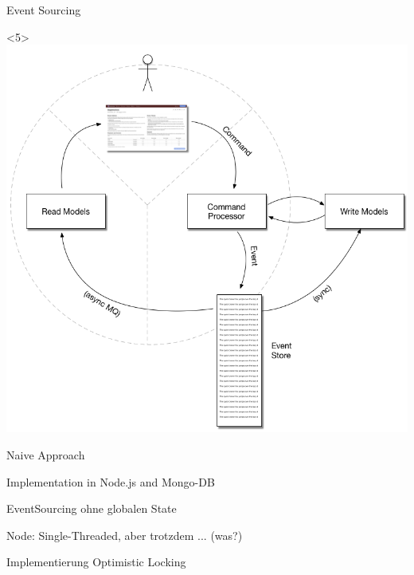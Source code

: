 \begin{frame}[fragile]{Event Sourcing}
\begin{onlyenv}<5>
\includegraphics[width=.7\textwidth]{../EventSourcing4.png}
\end{onlyenv}

\end{frame}

\begin{frame}[fragile]{}

Naive Approach

\end{frame}

\begin{frame}[fragile]{}

Implementation in Node.js and Mongo-DB

\end{frame}

\begin{frame}[fragile]{}

EventSourcing ohne globalen State

\end{frame}

\begin{frame}[fragile]{}

Node: Single-Threaded, aber trotzdem ... (was?)

\end{frame}

\begin{frame}[fragile]{}

Implementierung Optimistic Locking

\end{frame}

